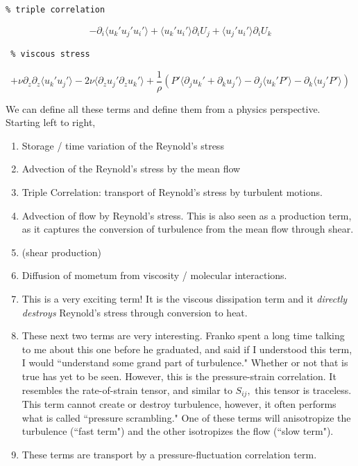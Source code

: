 \documentclass[
  letterpaper,
  DIV=11,
  numbers=noendperiod]{scrartcl}
\begin{document}
\begin{verbatim}
% triple correlation 
\end{verbatim}

\[  -   \partial_i \langle  u_k' u_j' u_i' \rangle 
    +  \langle u_k' u_i'\rangle  \partial_i U_j  
    + \langle u_j' u_i' \rangle \partial_i U_k  
    \]

\begin{verbatim}
 % viscous stress
\end{verbatim}

\[  + \nu \partial_z \partial_z \langle  u_k'  u_j' \rangle - 2 \nu \langle \partial_z u_j'\partial_z u_k' \rangle +
\frac{1}{\rho} \left( P' \langle \partial_j u_k' + \partial_k u_j' \rangle - \partial_j \langle u_k' P' \rangle  - \partial_k \langle u_j' P' \rangle \right)  \]

We can define all these terms and define them from a physics
perspective. Starting left to right,

\begin{enumerate}
    \item Storage / time variation of the Reynold's stress
    \item Advection of the Reynold's stress by the mean flow
    \item Triple Correlation: transport of Reynold's stress by turbulent motions. 
    \item Advection of flow by Reynold's stress. This is also seen as a production term, as it captures the conversion of turbulence from the mean flow through shear. 
    \item (shear production)
    \item Diffusion of mometum from viscosity / molecular interactions. 
    \item This is a very exciting term! It is the viscous dissipation term and it \textit{directly destroys} Reynold's stress through conversion to heat.  
    \item These next two terms are very interesting. Franko spent a long time talking to me about this one before he graduated, and said if I understood this term, I would ``understand some grand part of turbulence." Whether or not that is true has yet to be seen. However, this is the pressure-strain correlation. It resembles the rate-of-strain tensor, and similar to $S_{ij},$ this tensor is traceless. This term cannot create or destroy turbulence, however, it often performs what is called ``pressure scrambling." One of these terms will anisotropize the turbulence (``fast term") and the other isotropizes the flow (``slow term"). 
    \item These terms are transport by a pressure-fluctuation correlation term. 
\end{enumerate}
\end{document}
